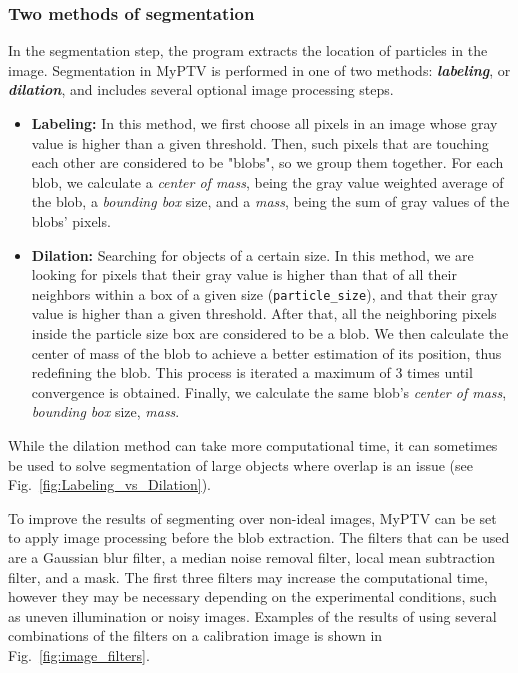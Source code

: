 \documentclass[10pt,a4paper]{article}
\begin{document}
\subsubsection{Two methods of segmentation} In the segmentation step, the program extracts the location of particles in the image. Segmentation in MyPTV is performed in one of two methods: \textbf{\textit{labeling}}, or \textbf{\textit{dilation}}, and includes several optional image processing steps. 
%
\begin{itemize}
	\item \textbf{Labeling:} In this method, we first choose all pixels in an image whose gray value is higher than a given threshold. Then, such pixels that are touching each other are considered to be "blobs", so we group them together. For each blob, we calculate a \textit{center of mass}, being the gray value weighted average of the blob, a \textit{bounding box} size, and a \textit{mass}, being the sum of gray values of the blobs' pixels.
	
	\item \textbf{Dilation:} Searching for objects of a certain size. In this method, we are looking for pixels that their gray value is higher than that of all their neighbors within a box of a given size (\texttt{particle\_size}), and that their gray value is higher than a given threshold. After that, all the neighboring pixels inside the particle size box are considered to be a blob. We then calculate the center of mass of the blob to achieve a better estimation of its position, thus redefining the blob. This process is iterated a maximum of 3 times until convergence is obtained. Finally, we calculate the same blob's \textit{center of mass}, \textit{bounding box} size, \textit{mass}.
\end{itemize}
%
While the dilation method can take more computational time, it can sometimes be used to solve segmentation of large objects where overlap is an issue (see Fig.~\ref{fig:Labeling_vs_Dilation}). 


To improve the results of segmenting over non-ideal images, MyPTV can be set to apply image processing before the blob extraction. The filters that can be used are a Gaussian blur filter, a median noise removal filter, local mean subtraction filter, and a mask. The first three filters may increase the computational time, however they may be necessary depending on the experimental conditions, such as uneven illumination or noisy images. Examples of the results of using several combinations of the filters on a calibration image is shown in Fig.~\ref{fig:image_filters}. 
\end{document}
